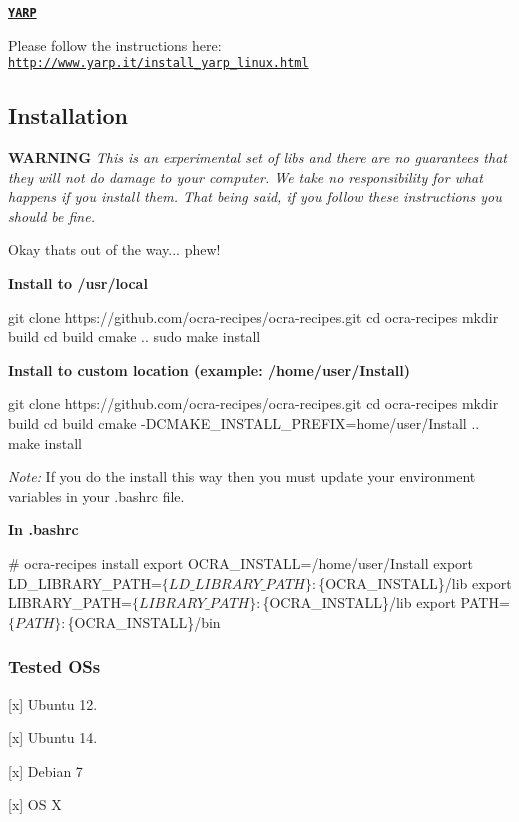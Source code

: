 \href{http://www.yarp.it}{\tt {\bfseries Y\+A\+RP}}

Please follow the instructions here\+: \href{http://www.yarp.it/install_yarp_linux.html}{\tt http\+://www.\+yarp.\+it/install\+\_\+yarp\+\_\+linux.\+html}

\subsection*{Installation}

{\bfseries W\+A\+R\+N\+I\+NG} {\itshape This is an experimental set of libs and there are no guarantees that they will not do damage to your computer. We take no responsibility for what happens if you install them. That being said, if you follow these instructions you should be fine.}

Okay that\textquotesingle{}s out of the way... phew!

{\bfseries Install to /usr/local} 
\begin{DoxyCode}
git clone https://github.com/ocra-recipes/ocra-recipes.git
cd ocra-recipes
mkdir build
cd build
cmake ..
sudo make install
\end{DoxyCode}


{\bfseries Install to custom location (example\+: /home/user/\+Install)} 
\begin{DoxyCode}
git clone https://github.com/ocra-recipes/ocra-recipes.git
cd ocra-recipes
mkdir build
cd build
cmake -DCMAKE\_INSTALL\_PREFIX=home/user/Install ..
make install
\end{DoxyCode}
 {\itshape Note\+:} If you do the install this way then you must update your environment variables in your {\ttfamily .bashrc} file.

{\bfseries In {\ttfamily .bashrc}} 
\begin{DoxyCode}
# ocra-recipes install
export OCRA\_INSTALL=/home/user/Install
export LD\_LIBRARY\_PATH=$\{LD\_LIBRARY\_PATH\}:$\{OCRA\_INSTALL\}/lib
export LIBRARY\_PATH=$\{LIBRARY\_PATH\}:$\{OCRA\_INSTALL\}/lib
export PATH=$\{PATH\}:$\{OCRA\_INSTALL\}/bin
\end{DoxyCode}


\subsubsection*{Tested OS\textquotesingle{}s}


\begin{DoxyItemize}
\item \mbox{[}x\mbox{]} Ubuntu 12.
\item \mbox{[}x\mbox{]} Ubuntu 14.
\item \mbox{[}x\mbox{]} Debian 7
\item \mbox{[}x\mbox{]} OS X
\end{DoxyItemize}

